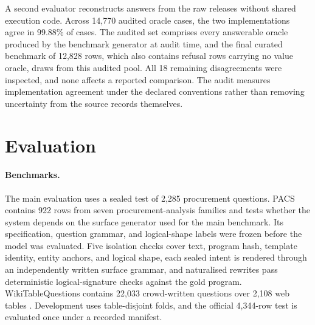 \documentclass{article}
\begin{document}
A second evaluator reconstructs answers from the raw releases without shared
execution code. Across 14{,}770 audited oracle cases, the two implementations
agree in 99.88\% of cases. The audited set comprises every answerable
oracle produced by the benchmark generator at audit time, and the final
curated benchmark of 12{,}828 rows, which also contains refusal rows
carrying no value oracle, draws from this audited pool. All 18 remaining disagreements were inspected, and
none affects a reported comparison. The audit measures implementation
agreement under the declared conventions rather than removing uncertainty
from the source records themselves.

\section{Evaluation}
\label{sec:evaluation}

\paragraph{Benchmarks.}
The main evaluation uses a sealed test of 2{,}285 procurement questions. PACS
contains 922 rows from seven procurement-analysis families and tests whether
the system depends on the surface generator used for the main benchmark. Its
specification, question grammar, and logical-shape labels were frozen before
the model was evaluated. Five isolation checks cover text, program hash, template identity, entity
anchors, and logical shape, each sealed intent is rendered through an
independently written surface grammar, and naturalised rewrites pass
deterministic logical-signature checks against the gold program. WikiTableQuestions
contains 22{,}033 crowd-written questions over 2{,}108 web tables
\citep{pasupat2015compositional}. Development uses table-disjoint folds, and
the official 4{,}344-row test is evaluated once under a recorded manifest.
\end{document}
